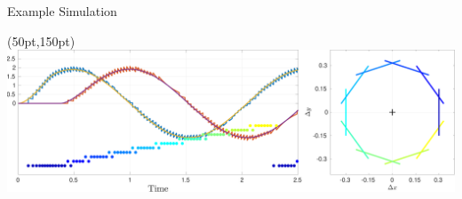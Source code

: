 \documentclass[17pt, t, lualatex]{beamer}
\begin{document}



\begin{frame}{Example Simulation}
	\begin{textblock*}{5cm}(50pt,150pt)
		\includegraphics[scale= 0.4]{figures/plots/Simulation/2d_perfect_gamma.pdf}
	\end{textblock*}
\end{frame}
\end{document}
